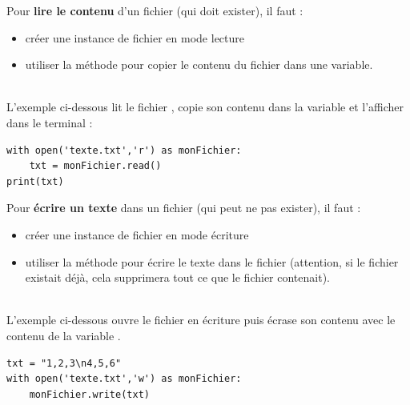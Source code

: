 \begin{methode}
    Pour \textbf{lire le contenu} d'un fichier (qui doit exister), il faut :
    \begin{itemize}
        \item créer une instance de fichier en mode lecture 
        \item utiliser la méthode  pour copier le contenu du fichier dans une variable.
    \end{itemize}~\\
    
    L'exemple ci-dessous lit le fichier , copie son contenu dans la variable  et l'afficher dans le terminal :
\begin{verbatim}
with open('texte.txt','r') as monFichier:
    txt = monFichier.read()
print(txt)
\end{verbatim}
\end{methode}

\begin{methode}
    Pour \textbf{écrire un texte} dans un fichier (qui peut ne pas exister), il faut :
    \begin{itemize}
        \item créer une instance de fichier en mode écriture 
        \item utiliser la méthode  pour écrire le texte dans le fichier (attention, si le fichier existait déjà, cela supprimera tout ce que le fichier contenait).
    \end{itemize}~\\
    
    L'exemple ci-dessous ouvre le fichier  en écriture puis écrase son contenu avec le contenu de la variable .
\begin{verbatim}
txt = "1,2,3\n4,5,6"
with open('texte.txt','w') as monFichier:
    monFichier.write(txt)
\end{verbatim}
\end{methode}

